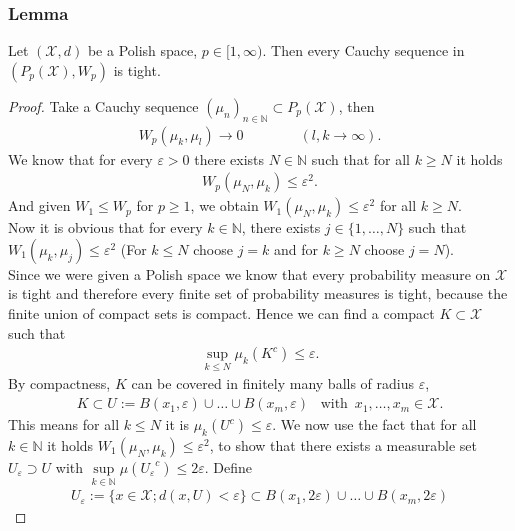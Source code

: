 \documentclass[11pt,a4paper]{article}
\begin{document}
\subsubsection{Lemma}
Let $(\mathcal{X},d)$ be a Polish space, $p\in[1,\infty)$. Then every Cauchy sequence in $(P_p(\mathcal{X}),W_p)$ is tight.
\begin{proof}
Take a Cauchy sequence $(\mu_n)_{n\in\mathbb{N}}\subset{}P_p(\mathcal{X})$, then
\begin{align*}
W_p(\mu_k,\mu_l)\rightarrow{}0\quad\quad\quad\quad{}(l,k\rightarrow\infty).
\end{align*} 
We know that for every $\varepsilon>0$ there exists $N\in\mathbb{N}$ such that for all $k\geq{}N$ it holds
\begin{align*}
W_p(\mu_N,\mu_k)\leq\varepsilon^2.
\end{align*}
And given $W_1\leq{}W_p$ for $p\geq{}1$, we obtain $W_1(\mu_N,\mu_k)\leq\varepsilon^2$ for all $k\geq{}N$. \vspace{1em}\\Now it is obvious that for every $k\in\mathbb{N}$, there exists $j\in\{1,\ldots,N\}$ such that $W_1(\mu_k,\mu_j)\leq\varepsilon^2$ (For $k\leq{}N$ choose $j=k$ and for $k\geq{}N$ choose $j=N$).\vspace{1em}\\
Since we were given a Polish space we know that every probability measure on $\mathcal{X}$ is tight and therefore every finite set of probability measures is tight, because the finite union of compact sets is compact. Hence we can find a compact $K\subset\mathcal{X}$ such that  
\begin{align*}
\sup\limits_{k\leq{}N} \mu_k(K^c)\leq\varepsilon.
\end{align*}
By compactness, $K$ can be covered in finitely many balls of radius $\varepsilon$, 
\begin{align*}
K\subset U:= B(x_1,\varepsilon)\cup\ldots\cup{}B(x_m,\varepsilon) \,\,\,\text{ with }\, x_1,\ldots,x_m\in\mathcal{X}.
\end{align*}
This means for all $k\leq{}N$ it is $\mu_k(U^c)\leq\varepsilon$. We now use the fact that for all $k\in\mathbb{N}$ it holds $W_1(\mu_N,\mu_k)\leq\varepsilon^2$, to show that there exists a measurable set $U_\varepsilon\supset{}U$ with $\sup\limits_{k\in\mathbb{N}}\mu({U_\varepsilon}^c)\leq{}2\varepsilon$.
Define 
\begin{align*}U_\varepsilon:=\Big\lbrace{}x\in\mathcal{X}; d(x,U)<\varepsilon\Big\rbrace \subset B(x_1,2\varepsilon)\cup\ldots\cup B(x_m,2\varepsilon)

\end{align*}
\end{proof}
\end{document}
